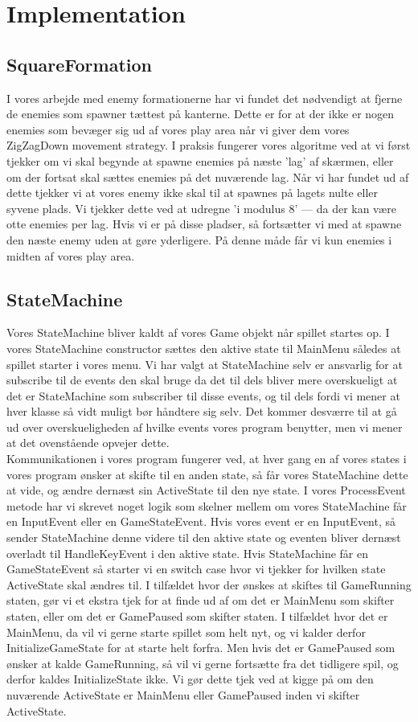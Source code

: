 \documentclass{article}
\begin{document}
\section{Implementation}
\subsection{SquareFormation}
I vores arbejde med enemy formationerne har vi fundet det nødvendigt at fjerne de enemies som spawner tættest på kanterne. Dette er for at der ikke er nogen enemies som bevæger sig ud af vores play area når vi giver dem vores ZigZagDown movement strategy. I praksis fungerer vores algoritme ved at vi først tjekker om vi skal begynde at spawne enemies på næste 'lag' af skærmen, eller om der fortsat skal sættes enemies på det nuværende lag. Når vi har fundet ud af dette tjekker vi at vores enemy ikke skal til at spawnes på lagets nulte eller syvene plads. Vi tjekker dette ved at udregne 'i modulus 8' --- da der kan være otte enemies per lag. Hvis vi er på disse pladser, så fortsætter vi med at spawne den næste enemy uden at gøre yderligere. På denne måde får vi kun enemies i midten af vores play area.

\subsection{StateMachine}
Vores StateMachine bliver kaldt af vores Game objekt når spillet startes op. I vores StateMachine constructor sættes den aktive state til MainMenu således at spillet starter i vores menu. Vi har valgt at StateMachine selv er ansvarlig for at subscribe til de events den skal bruge da det til dels bliver mere overskueligt at det er StateMachine som subscriber til disse events, og til dels fordi vi mener at hver klasse så vidt muligt bør håndtere sig selv. Det kommer desværre til at gå ud over overskueligheden af hvilke events vores program benytter, men vi mener at det ovenstående opvejer dette.\\
Kommunikationen i vores program fungerer ved, at hver gang en af vores states i vores program ønsker at skifte til en anden state, så får vores StateMachine dette at vide, og ændre dernæst sin ActiveState til den nye state. I vores ProcessEvent metode har vi skrevet noget logik som skelner mellem om vores StateMachine får en InputEvent eller en GameStateEvent. Hvis vores event er en InputEvent, så sender StateMachine denne videre til den aktive state og eventen bliver dernæst overladt til HandleKeyEvent i den aktive state. Hvis StateMachine får en GameStateEvent så starter vi en switch case hvor vi tjekker for hvilken state ActiveState skal ændres til. I tilfældet hvor der ønskes at skiftes til GameRunning staten, gør vi et ekstra tjek for at finde ud af om det er MainMenu som skifter staten, eller om det er GamePaused som skifter staten. I tilfældet hvor det er MainMenu, da vil vi gerne starte spillet som helt nyt, og vi kalder derfor InitializeGameState for at starte helt forfra. Men hvis det er GamePaused som ønsker at kalde GameRunning, så vil vi gerne fortsætte fra det tidligere spil, og derfor kaldes InitializeState ikke. Vi gør dette tjek ved at kigge på om den nuværende ActiveState er MainMenu eller GamePaused inden vi skifter ActiveState.
\end{document}
